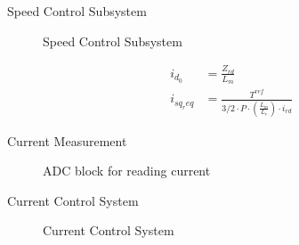 \begin{frame}{Speed Control Subsystem}
	\vspace{-0.5cm} %
	\begin{figure}
		\centering
		\caption{Speed Control Subsystem}
	\end{figure}
	\vspace{-0.5cm} %
	\begin{align}
		i_{d_0}    & = \frac{Z_{rd}}{L_m}                                                          \\
		i_{sq_req} & = \frac{T^{ref}}{3/2 \cdot P \cdot \left(\frac{L_m}{L_r}\right) \cdot i_{rd}}
	\end{align}
\end{frame}


\begin{frame}{Current Measurement}
	\begin{figure}
		\centering

		\caption{ADC block for reading current}
	\end{figure}
\end{frame}

\begin{frame}{Current Control System}
	\begin{figure}
		\centering

		\caption{Current Control System}
	\end{figure}
\end{frame}



